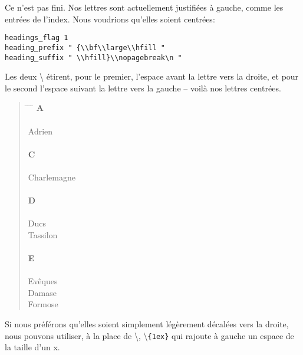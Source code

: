 Ce n'est pas fini. Nos lettres sont actuellement justifiées à gauche, comme les entrées de l'index. Nous voudrions qu'elles soient centrées: 

\begin{verbatim}
headings_flag 1
heading_prefix " {\\bf\\large\\hfill " 
heading_suffix " \\hfill}\\nopagebreak\n " 
\end{verbatim}

Les deux \textbackslash{} étirent, pour le premier, l'espace avant la lettre vers la droite, et pour le second l'espace suivant la lettre vers la gauche -- voilà nos lettres centrées.

\begin{quotation}
\begin{tabbing}
\hspace{0,5cm}  \= \hspace{1cm} \= \hspace{1,5cm} \= \kill
\>\> \large{\textbf{A}}\\
\\
Adrien\>\> \\
\\
\>\> \large{\textbf{C}}\\
\\
Charlemagne \>\> \\
\\
\>\> \large{\textbf{D}}\\
\\
Ducs \\
\> Tassilon\>\\
\\
\>\> \large{\textbf{E}}\\
\\
Evêques \\
\> Damase \>\\
\> Formose\>\\

\end{tabbing}
\end{quotation}


Si nous préférons qu'elles soient simplement légèrement décalées vers la droite, nous pouvons utiliser, à la place de \textbackslash{}, \textbackslash{}\verb|{1ex}| qui rajoute à gauche un espace de la taille d'un x. 


